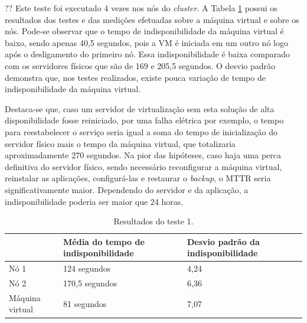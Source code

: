 ?? Este teste foi executado 4 vezes nos nós do \textit{cluster}. A Tabela \ref{tab:teste1resultados} possui os resultados
dos testes e das medições efetuadas sobre a máquina virtual e sobre os nós. Pode-se observar que o tempo de indisponibilidade da máquina virtual 
é baixo, sendo apenas 40,5 segundos, pois a \ac{VM} é iniciada em um outro nó logo após o desligamento do primeiro nó. Essa indisponibilidade é 
baixa comparado com os servidores físicos que são de 169 e 205,5 segundos. O desvio padrão demonstra que, nos testes realizados, existe pouca 
variação de tempo de indisponibilidade da máquina virtual.

Destaca-se que, caso um servidor de virtualização sem esta solução de alta disponibilidade fosse reiniciado, por uma falha elétrica por exemplo, 
o tempo para reestabelecer o serviço seria igual a soma do tempo de inicialização do servidor físico mais o tempo da máquina virtual, 
que totalizaria aproximadamente 270 segundos. 
Na pior das hipóteses, caso haja uma perca definitiva do servidor físico, sendo necessário reconfigurar a máquina virtual, reinstalar as aplicações,
configurá-las e restaurar o \textit{backup}, o \ac{MTTR} seria significativamente maior. Dependendo do servidor e da aplicação, 
a indisponibilidade poderia ser maior que 24 horas.



\begin{table}[h!]
\caption{Resultados do teste 1.}
\label{tab:teste1resultados}
\begin{center}
\begin{tabular}{|l|l|l|}\hline
 & \textbf{Média do tempo de indisponibilidade} & \textbf{Desvio padrão da indisponibilidade} \\\hline
Nó 1 & 124 segundos & 4,24 \\\hline
Nó 2 & 170,5 segundos & 6,36 \\\hline
Máquina virtual & 81 segundos & 7,07 \\\hline
\end{tabular}
\end{center}
\end{table}

